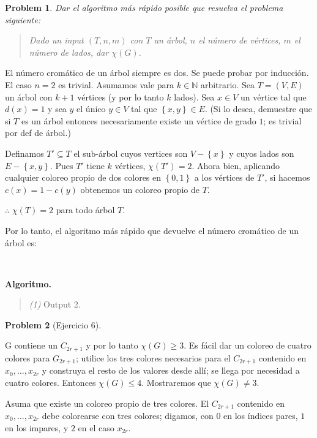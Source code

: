 \documentclass[a4paper]{article}
\newtheorem{problem}{Problem}
\newtheorem{problem}{Problem}
\begin{document}
\begin{problem}
    Dar el algoritmo más rápido posible que resuelva el problema siguiente: 

    \begin{quote}
        Dado un input $(T, n, m)$ con $T$ un árbol, $n$ el número de vértices,
        $m$ el número de lados, dar $\chi(G)$.
    \end{quote}
\end{problem}

El número cromático de un árbol siempre es dos. Se puede probar por inducción.
El caso $n = 2$ es trivial. Asumamos vale para $k \in \mathbb{N}$ arbitrario.
Sea $T = (V, E)$ un árbol con $k + 1$ vértices (y por lo tanto $k$ lados).
Sea $x \in V$ un vértice tal que $d(x) = 1$ y sea $y$ el único $y \in V$ tal que
$\left\{ x, y \right\} \in E $. (Si lo desea, demuestre que si $T$
es un árbol entonces necesariamente existe un vértice de grado $1$; es trivial
por def de árbol.) 

Definamos $T' \subseteq T$ el sub-árbol cuyos vertices son $V - \left\{ x
\right\} $ y cuyos lados son $E - \left\{ x, y \right\} $. Pues $T'$ tiene $k$
vértices, $\chi(T') = 2$. Ahora bien, aplicando cualquier coloreo propio de dos
colores en $\left\{ 0, 1 \right\} $ a los vértices de $T'$, si hacemos $c(x) = 1
- c(y)$ obtenemos un coloreo propio de $T$. 

$\therefore $ $\chi(T) = 2$ para todo árbol $T$.

Por lo tanto, el algoritmo más rápido que devuelve el número cromático de un
árbol es:

~

\textbf{Algoritmo.} 
\begin{quote}
    \textit{(1)} Output 2.
\end{quote}

\pagebreak

\begin{problem}[Ejercicio 6]
\end{problem} 

G contiene un $C_{2r + 1}$ y por lo tanto $\chi(G) \geq 3$. Es fácil dar un
coloreo de cuatro colores para $G_{2r+1}$; utilice los tres colores necesarios
para el $C_{2r+1}$ contenido en $x_0, \ldots, x_{2r}$ y construya el resto de
los valores desde allí; se llega por necesidad a cuatro colores. Entonces
$\chi(G) \leq 4$. Mostraremos que $\chi(G) \neq 3$.

Asuma que existe un coloreo propio de tres colores. El $C_{2r+1}$ contenido en
$x_0, \ldots, x_{2r}$ debe colorearse con tres colores; digamos, con $0$ en los
índices pares, $1$ en los impares, y $2$ en el caso $x_{2r}$.
\end{document}
